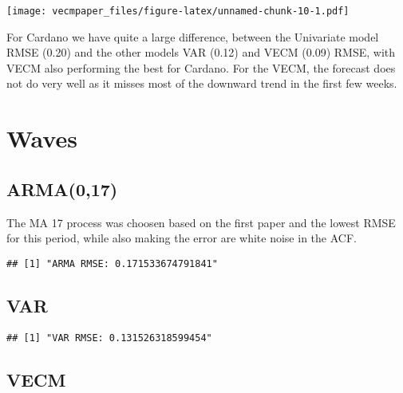 \documentclass[
]{article}
\newenvironment{Shaded}{\begin{snugshade}}{\end{snugshade}}
\newcommand{\DecValTok}[1]{\textcolor[rgb]{0.00,0.00,0.81}{#1}}
\newcommand{\FunctionTok}[1]{\textcolor[rgb]{0.00,0.00,0.00}{#1}}
\newcommand{\NormalTok}[1]{#1}
\newcommand{\OtherTok}[1]{\textcolor[rgb]{0.56,0.35,0.01}{#1}}
\newcommand{\SpecialCharTok}[1]{\textcolor[rgb]{0.00,0.00,0.00}{#1}}
\newcommand{\StringTok}[1]{\textcolor[rgb]{0.31,0.60,0.02}{#1}}
\begin{document}
\texttt{[image: vecmpaper\_files/figure-latex/unnamed-chunk-10-1.pdf]}

For Cardano we have quite a large difference, between the Univariate
model RMSE (0.20) and the other models VAR (0.12) and VECM (0.09) RMSE,
with VECM also performing the best for Cardano. For the VECM, the
forecast does not do very well as it misses most of the downward trend
in the first few weeks.

\hypertarget{waves}{%
\section{Waves}\label{waves}}

\hypertarget{arma017-1}{%
\subsection{ARMA(0,17)}\label{arma017-1}}

The MA 17 process was choosen based on the first paper and the lowest
RMSE for this period, while also making the error are white noise in the
ACF.

\begin{verbatim}
## [1] "ARMA RMSE: 0.171533674791841"
\end{verbatim}

\hypertarget{var-3}{%
\subsection{VAR}\label{var-3}}

\begin{verbatim}
## [1] "VAR RMSE: 0.131526318599454"
\end{verbatim}

\hypertarget{vecm-3}{%
\subsection{VECM}\label{vecm-3}}

\begin{Shaded}
\end{Shaded}
\end{document}
